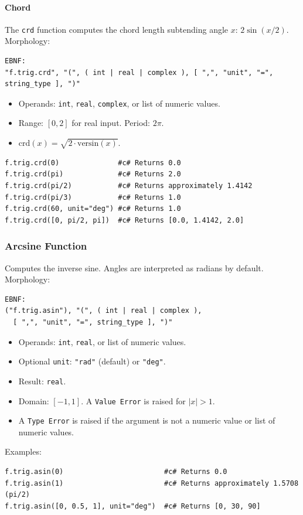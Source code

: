 \paragraph{Chord}
The \texttt{crd} function computes the chord length subtending angle $x$: $2\sin(x/2)$.\\
Morphology:
\begin{verbatim}
EBNF:
"f.trig.crd", "(", ( int | real | complex ), [ ",", "unit", "=", string_type ], ")"
\end{verbatim}
\begin{itemize}
\item Operands: \texttt{int}, \texttt{real}, \texttt{complex}, or list of numeric values.
\item Range: $[0, 2]$ for real input. Period: $2\pi$.
\item $\text{crd}(x) = \sqrt{2 \cdot \text{versin}(x)}$.
\end{itemize}
\begin{verbatim}
f.trig.crd(0)              #c# Returns 0.0
f.trig.crd(pi)             #c# Returns 2.0
f.trig.crd(pi/2)           #c# Returns approximately 1.4142
f.trig.crd(pi/3)           #c# Returns 1.0
f.trig.crd(60, unit="deg") #c# Returns 1.0
f.trig.crd([0, pi/2, pi])  #c# Returns [0.0, 1.4142, 2.0]
\end{verbatim}

\subsubsection{Arcsine Function}
Computes the inverse sine. Angles are interpreted as radians by default. \\
Morphology:
\begin{verbatim}
EBNF:
("f.trig.asin"), "(", ( int | real | complex ), 
  [ ",", "unit", "=", string_type ], ")"
\end{verbatim}
\begin{itemize}
\item Operands: \texttt{int}, \texttt{real}, or list of numeric values.
\item Optional \texttt{unit}: \texttt{"rad"} (default) or \texttt{"deg"}.
\item Result: \texttt{real}.
\item Domain: $[-1, 1]$. A \texttt{Value Error} is raised for $|x| > 1$.
\item A \texttt{Type Error} is raised if the argument is not a numeric value or list of numeric values.
\end{itemize}
Examples:
\begin{verbatim}
f.trig.asin(0)                        #c# Returns 0.0
f.trig.asin(1)                        #c# Returns approximately 1.5708 (pi/2)
f.trig.asin([0, 0.5, 1], unit="deg")  #c# Returns [0, 30, 90]
\end{verbatim}

